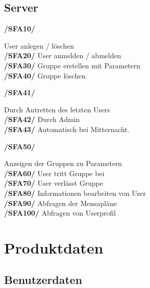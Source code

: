 \documentclass[a4paper]{scrreprt}
\begin{document}
\section{Server}

\begin{addmargin}[25pt]{0pt} 
\hypertarget{sfa10}{\textbf{/SFA10/}} User anlegen / löschen\\
\hypertarget{sfa20}{\textbf{/SFA20/}} User anmelden / abmelden\\
\hypertarget{sfa30}{\textbf{/SFA30/}} Gruppe erstellen mit Parametern\\
\hypertarget{sfa40}{\textbf{/SFA40/}} Gruppe löschen\\
	\begin{addmargin}[25pt]{0pt} 
	\hypertarget{sfa41}{\textbf{/SFA41/}} Durch Autretten des letzten Users\\
	\hypertarget{sfa42}{\textbf{/SFA42/}} Durch Admin\\
	\hypertarget{sfa43}{\textbf{/SFA43/}} Automatisch bei Mitternacht.\\
	\end{addmargin}
\hypertarget{sfa50}{\textbf{/SFA50/}} Anzeigen der Gruppen zu Parametern\\
\hypertarget{sfa60}{\textbf{/SFA60/}} User tritt Gruppe bei\\
\hypertarget{sfa70}{\textbf{/SFA70/}} User verlässt Gruppe\\
\hypertarget{sfa80}{\textbf{/SFA80/}} Informationen bearbeiten von User\\
\hypertarget{sfa90}{\textbf{/SFA90/}} Abfragen der Mensapläne\\
\hypertarget{sfa100}{\textbf{/SFA100/}} Abfragen von Userprofil\\
\end{addmargin}

\chapter{Produktdaten}

\section{Benutzerdaten}
\end{document}
